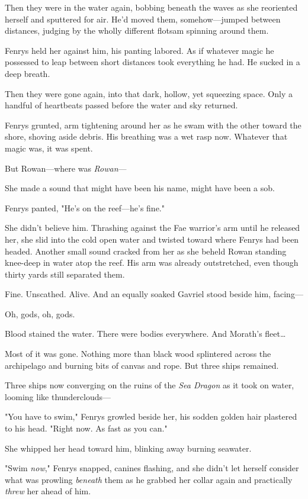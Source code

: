 Then they were in the water again, bobbing beneath the waves as she reoriented herself and sputtered for air. He'd moved them, somehow---jumped between distances, judging by the wholly different flotsam spinning around them.

Fenrys held her against him, his panting labored. As if whatever magic he possessed to leap between short distances took everything he had. He sucked in a deep breath.

Then they were gone again, into that dark, hollow, yet squeezing space. Only a handful of heartbeats passed before the water and sky returned.

Fenrys grunted, arm tightening around her as he swam with the other toward the shore, shoving aside debris. His breathing was a wet rasp now. Whatever that magic was, it was spent.

But Rowan---where was \emph{Rowan}---

She made a sound that might have been his name, might have been a sob.

Fenrys panted, "He's on the reef---he's fine."

She didn't believe him. Thrashing against the Fae warrior's arm until he released her, she slid into the cold open water and twisted toward where Fenrys had been headed. Another small sound cracked from her as she beheld Rowan standing knee-deep in water atop the reef. His arm was already outstretched, even though thirty yards still separated them.

Fine. Unscathed. Alive. And an equally soaked Gavriel stood beside him, facing---

Oh, gods, oh, gods.

Blood stained the water. There were bodies everywhere. And Morath's fleet\ldots{}

Most of it was gone. Nothing more than black wood splintered across the archipelago and burning bits of canvas and rope. But three ships remained.

Three ships now converging on the ruins of the \emph{Sea Dragon} as it took on water, looming like thunderclouds---

"You have to swim," Fenrys growled beside her, his sodden golden hair plastered to his head. "Right now. As fast as you can."

She whipped her head toward him, blinking away burning seawater.

"Swim \emph{now}," Fenrys snapped, canines flashing, and she didn't let herself consider what was prowling \emph{beneath} them as he grabbed her collar again and practically \emph{threw} her ahead of him.


